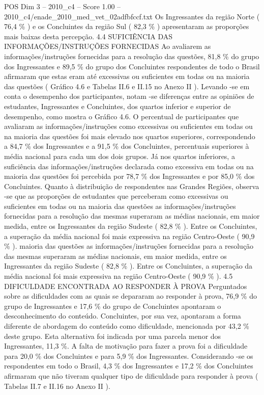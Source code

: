 \begin{textsample}{POS Dim 3 – 2010\_c4 – Score 1.00 – 2010\_c4/enade\_2010\_med\_vet\_02adfbfccf.txt}
Os Ingressantes da região Norte ( 76,4 \% ) e os Concluintes da região Sul ( 82,3 \% ) apresentaram as proporções mais baixas desta percepção. 4.4 SUFICIÊNCIA DAS INFORMAÇÕES/INSTRUÇÕES FORNECIDAS Ao avaliarem as informações/instruções fornecidas para a resolução das questões, 81,8 \% do grupo dos Ingressantes e 89,5 \% do grupo dos Concluintes respondentes de todo o Brasil afirmaram que estas eram até excessivas ou suficientes em todas ou na maioria das questões ( Gráfico 4.6 e Tabelas II.6 e II.15 no Anexo II ).
Levando -se em conta o desempenho dos participantes, notam -se diferenças entre as opiniões de estudantes, Ingressantes e Concluintes, dos quartos inferior e superior de desempenho, como mostra o Gráfico 4.6.
O percentual de participantes que avaliaram as informações/instruções como excessivas ou suficientes em todas ou na maioria das questões foi mais elevado nos quartos superiores, correspondendo a 84,7 \% dos Ingressantes e a 91,5 \% dos Concluintes, percentuais superiores à média nacional para cada um dos dois grupos.
Já nos quartos inferiores, a suficiência das informações/instruções declarada como excessiva em todas ou na maioria das questões foi percebida por 78,7 \% dos Ingressantes e por 85,0 \% dos Concluintes.
Quanto à distribuição de respondentes nas Grandes Regiões, observa -se que as proporções de estudantes que perceberam como excessivas ou suficientes em todas ou na maioria das questões as informações/instruções fornecidas para a resolução das mesmas superaram as médias nacionais, em maior medida, entre os Ingressantes da região Sudeste ( 82,8 \% ).
Entre os Concluintes, a superação da média nacional foi mais expressiva na região Centro-Oeste ( 90,9 \% ). maioria das questões as informações/instruções fornecidas para a resolução das mesmas superaram as médias nacionais, em maior medida, entre os Ingressantes da região Sudeste ( 82,8 \% ).
Entre os Concluintes, a superação da média nacional foi mais expressiva na região Centro-Oeste ( 90,9 \% ). 4.5 DIFICULDADE ENCONTRADA AO RESPONDER À PROVA Perguntados sobre as dificuldades com as quais se depararam ao responder à prova, 76,9 \% do grupo de Ingressantes e 17,6 \% do grupo de Concluintes apontaram o desconhecimento do conteúdo.
Concluintes, por sua vez, apontaram a forma diferente de abordagem do conteúdo como dificuldade, mencionada por 43,2 \% deste grupo.
Esta alternativa foi indicada por uma parcela menor dos Ingressantes, 11,3 \%.
A falta de motivação para fazer a prova foi a dificuldade para 20,0 \% dos Concluintes e para 5,9 \% dos Ingressantes.
Considerando -se os respondentes em todo o Brasil, 4,3 \% dos Ingressantes e 17,2 \% dos Concluintes afirmaram que não tiveram qualquer tipo de dificuldade para responder à prova ( Tabelas II.7 e II.16 no Anexo II ).

\end{textsample}
